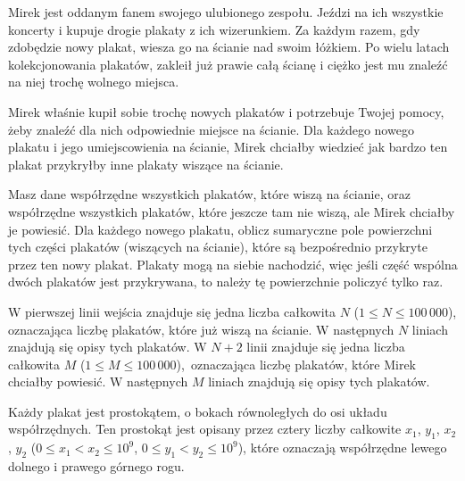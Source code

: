 

\usepackage[utf8]{inputenc}
\usepackage[T1]{fontenc}
\usepackage[polish]{babel}
\usepackage{polski}

\usepackage{tikz}





Mirek jest oddanym fanem swojego ulubionego zespołu.
Jeździ na ich wszystkie koncerty i kupuje drogie plakaty z ich wizerunkiem.
Za każdym razem, gdy zdobędzie nowy plakat, wiesza go na ścianie nad swoim łóżkiem.
Po wielu latach kolekcjonowania plakatów, zakleił już prawie całą ścianę i ciężko
	jest mu znaleźć na niej trochę wolnego miejsca.

Mirek właśnie kupił sobie trochę nowych plakatów i potrzebuje Twojej pomocy,
	żeby znaleźć dla nich odpowiednie miejsce na ścianie.
Dla każdego nowego plakatu i jego umiejscowienia na ścianie,
	Mirek chciałby wiedzieć jak bardzo ten plakat przykryłby inne plakaty wiszące na ścianie.


Masz dane współrzędne wszystkich plakatów, które wiszą na ścianie,
	oraz współrzędne wszystkich plakatów, które jeszcze tam nie wiszą,
	ale Mirek chciałby je powiesić.
Dla każdego nowego plakatu, oblicz sumaryczne pole powierzchni tych części plakatów (wiszących na ścianie),
	które są bezpośrednio przykryte przez ten nowy plakat.
Plakaty mogą na siebie nachodzić, więc jeśli część wspólna dwóch plakatów jest przykrywana,
	to należy tę powierzchnie policzyć tylko raz.


W pierwszej linii wejścia znajduje się jedna liczba całkowita $N$ ($1 \le N \le 100\,000$),
	oznaczająca liczbę plakatów, które już wiszą na ścianie.
W następnych $N$ liniach znajdują się opisy tych plakatów.
W $N+2$ linii znajduje się jedna liczba całkowita $M$ ($1 \le M \le 100\,000$),\
	oznaczająca liczbę plakatów, które Mirek chciałby powiesić.
W następnych $M$ liniach znajdują się opisy tych plakatów.

Każdy plakat jest prostokątem, o bokach równoległych do osi układu współrzędnych.
Ten prostokąt jest opisany przez cztery liczby całkowite $x_1$, $y_1$, $x_2$, $y_2$
	($0 \le x_1 < x_2 \le 10^9$, $0 \le y_1 < y_2 \le 10^9$),
	które oznaczają współrzędne lewego dolnego i prawego górnego rogu.

